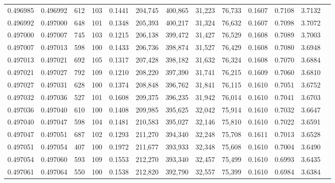 \begin{tabular}{rrrrrrrrrrrrr}
0.496985 & 0.496992 &   612 & 103 &                                     0.1441 & 204,745 & 400,865 &  31,223 &  76,733 & 0.1607 & 0.7108 & 3.7132 \\
0.496992 & 0.497000 &   648 & 101 &                                     0.1348 & 205,393 & 400,217 &  31,324 &  76,632 & 0.1607 & 0.7098 & 3.7072 \\
0.497000 & 0.497007 &   745 & 103 &                                     0.1215 & 206,138 & 399,472 &  31,427 &  76,529 & 0.1608 & 0.7089 & 3.7003 \\
0.497007 & 0.497013 &   598 & 100 &                                     0.1433 & 206,736 & 398,874 &  31,527 &  76,429 & 0.1608 & 0.7080 & 3.6948 \\
0.497013 & 0.497021 &   692 & 105 &                                     0.1317 & 207,428 & 398,182 &  31,632 &  76,324 & 0.1608 & 0.7070 & 3.6884 \\
0.497021 & 0.497027 &   792 & 109 &                                     0.1210 & 208,220 & 397,390 &  31,741 &  76,215 & 0.1609 & 0.7060 & 3.6810 \\
0.497027 & 0.497031 &   628 & 100 &                                     0.1374 & 208,848 & 396,762 &  31,841 &  76,115 & 0.1610 & 0.7051 & 3.6752 \\
0.497032 & 0.497036 &   527 & 101 &                                     0.1608 & 209,375 & 396,235 &  31,942 &  76,014 & 0.1610 & 0.7041 & 3.6703 \\
0.497036 & 0.497040 &   610 & 100 &                                     0.1408 & 209,985 & 395,625 &  32,042 &  75,914 & 0.1610 & 0.7032 & 3.6647 \\
0.497040 & 0.497047 &   598 & 104 &                                     0.1481 & 210,583 & 395,027 &  32,146 &  75,810 & 0.1610 & 0.7022 & 3.6591 \\
0.497047 & 0.497051 &   687 & 102 &                                     0.1293 & 211,270 & 394,340 &  32,248 &  75,708 & 0.1611 & 0.7013 & 3.6528 \\
0.497051 & 0.497054 &   407 & 100 &                                     0.1972 & 211,677 & 393,933 &  32,348 &  75,608 & 0.1610 & 0.7004 & 3.6490 \\
0.497054 & 0.497060 &   593 & 109 &                                     0.1553 & 212,270 & 393,340 &  32,457 &  75,499 & 0.1610 & 0.6993 & 3.6435 \\
0.497061 & 0.497064 &   550 & 100 &                                     0.1538 & 212,820 & 392,790 &  32,557 &  75,399 & 0.1610 & 0.6984 & 3.6384 \\

\end{tabular}
